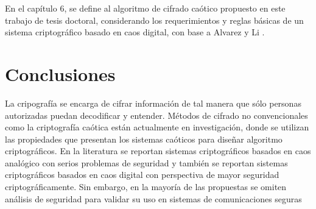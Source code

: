 En el capítulo 6, se define al algoritmo de cifrado caótico propuesto en este trabajo de tesis doctoral, considerando los requerimientos y reglas básicas de un sistema criptográfico basado en caos digital, con base a Alvarez y Li \cite{AyL_2006}.  

\section{Conclusiones}
La cripografía se encarga de cifrar información de tal manera que sólo personas autorizadas puedan decodificar y entender. Métodos de cifrado no convencionales como la criptografía caótica están actualmente en investigación, donde se utilizan las propiedades que presentan los sistemas caóticos para diseñar algoritmo criptográficos. En la literatura se reportan sistemas criptográficos basados en caos analógico con serios problemas de seguridad y también se reportan sistemas criptográficos basados en caos digital con perspectiva de mayor seguridad criptográficamente. Sin embargo, en la mayoría de las propuestas se omiten análisis de seguridad para validar su uso en sistemas de comunicaciones seguras      
